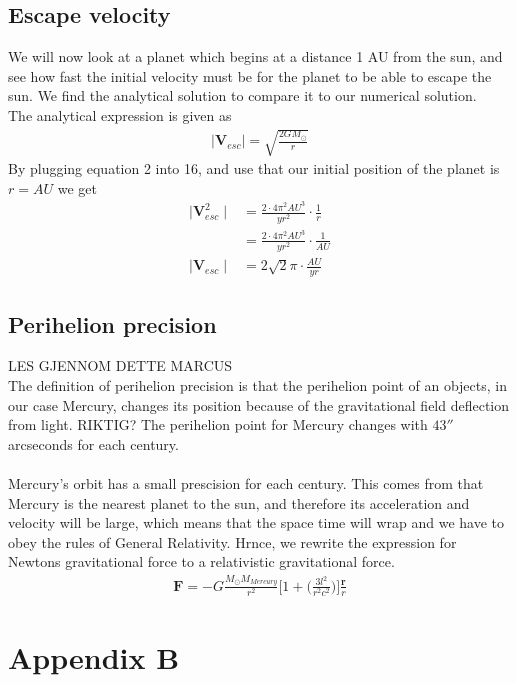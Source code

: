\documentclass{article}
\begin{document}
\subsection{Escape velocity}
We will now look at a planet which begins at a distance 1 AU from the sun, 
and see how fast the initial velocity must be for the planet to be able to escape the sun. We find the analytical solution to compare it to our numerical solution. \\
The analytical expression is given as 
\begin{align}
    \mid{\mathbf{V}_{esc}}\mid=\sqrt{\frac{2GM_{\odot}}{r}}
\end{align}
By plugging equation 2 into 16, and use that our initial position of the planet is $r=AU$ we get
\begin{align}
\mid{\mathbf{V}_{esc}^2}\mid&=\frac{2\cdot 4\pi^2AU^3}{yr^2}\cdot\frac{1}{r}\\
&=\frac{2\cdot 4\pi^2AU^3}{yr^2}\cdot\frac{1}{AU}\\
\mid{\mathbf{V}_{esc}}\mid&=2\sqrt{2}\pi\cdot\frac{AU}{yr}
\end{align}
\subsection{Perihelion precision}
LES GJENNOM DETTE MARCUS\\
The definition of perihelion precision is that the perihelion point of an objects, in our case Mercury, changes its position because of 
the gravitational field deflection from light. RIKTIG? The perihelion point for Mercury changes with $43''$ arcseconds for each century. \\
\\
Mercury's orbit has a small prescision for each century. This comes from that Mercury is the nearest planet to the sun, and therefore its acceleration and velocity will be large, which means that the space time will wrap    and we have to obey the rules of General Relativity. Hrnce, we rewrite the expression for Newtons gravitational force to a relativistic gravitational force.
\begin{align}
    \mathbf{F}=-G\frac{M_{\odot}M_{Mercury}}{r^2}\Bigg[1+\Bigg(\frac{3l^2}{r^2c^2}\bigg)\bigg]\frac{\mathbf{r}}{r}
\end{align}

\section{Appendix B} %
\end{document}
